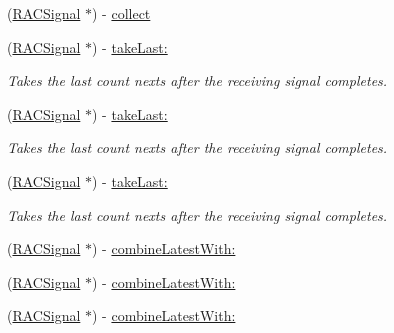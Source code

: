 \begin{DoxyCompactItemize}
\item 
(\mbox{\hyperlink{interface_r_a_c_signal}{R\+A\+C\+Signal}} $\ast$) -\/ \mbox{\hyperlink{interface_r_a_c_signal_a70b8f976dc0ece9b82e47cdb346a3a09}{collect}}
\item 
\mbox{\label{interface_r_a_c_signal_a0f359e9261777b7999c7229c105211ee}} 
(\mbox{\hyperlink{interface_r_a_c_signal}{R\+A\+C\+Signal}} $\ast$) -\/ \mbox{\hyperlink{interface_r_a_c_signal_a0f359e9261777b7999c7229c105211ee}{take\+Last\+:}}
\begin{DoxyCompactList}\small\item\em Takes the last {\ttfamily count} {\ttfamily next}s after the receiving signal completes. \end{DoxyCompactList}\item 
\mbox{\label{interface_r_a_c_signal_a0f359e9261777b7999c7229c105211ee}} 
(\mbox{\hyperlink{interface_r_a_c_signal}{R\+A\+C\+Signal}} $\ast$) -\/ \mbox{\hyperlink{interface_r_a_c_signal_a0f359e9261777b7999c7229c105211ee}{take\+Last\+:}}
\begin{DoxyCompactList}\small\item\em Takes the last {\ttfamily count} {\ttfamily next}s after the receiving signal completes. \end{DoxyCompactList}\item 
\mbox{\label{interface_r_a_c_signal_a0f359e9261777b7999c7229c105211ee}} 
(\mbox{\hyperlink{interface_r_a_c_signal}{R\+A\+C\+Signal}} $\ast$) -\/ \mbox{\hyperlink{interface_r_a_c_signal_a0f359e9261777b7999c7229c105211ee}{take\+Last\+:}}
\begin{DoxyCompactList}\small\item\em Takes the last {\ttfamily count} {\ttfamily next}s after the receiving signal completes. \end{DoxyCompactList}\item 
(\mbox{\hyperlink{interface_r_a_c_signal}{R\+A\+C\+Signal}} $\ast$) -\/ \mbox{\hyperlink{interface_r_a_c_signal_afab1b19558df566351cf87e466a5022f}{combine\+Latest\+With\+:}}
\item 
(\mbox{\hyperlink{interface_r_a_c_signal}{R\+A\+C\+Signal}} $\ast$) -\/ \mbox{\hyperlink{interface_r_a_c_signal_afab1b19558df566351cf87e466a5022f}{combine\+Latest\+With\+:}}
\item 
(\mbox{\hyperlink{interface_r_a_c_signal}{R\+A\+C\+Signal}} $\ast$) -\/ \mbox{\hyperlink{interface_r_a_c_signal_afab1b19558df566351cf87e466a5022f}{combine\+Latest\+With\+:}}

\end{DoxyCompactItemize}
